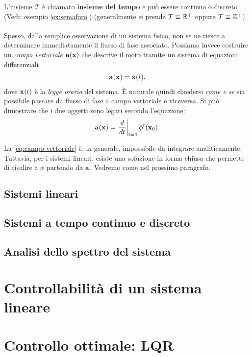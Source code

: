 L'insieme $\mathcal T$ è chiamato \textbf{insieme del tempo} e può essere continuo
o discreto (Vedi: esempio \ref{ex:semaforo}) (generalmente si prende $\mathcal T \equiv \mathbb{R}^+$ oppure $\mathcal T \equiv \mathbb{Z}^+$).

\paragraph{}
Spesso, dalla semplice osservazione di un sistema fisico, non se ne riesce a determinare
immediatamente il flusso di fase associato. Possiamo invece costruire un \emph{campo vettoriale} $\mathbf{a}(\mathbf{x})$
che descrive il moto tramite un sistema di equazioni differenziali
\begin{equation*}
    \mathbf{a}(\mathbf{x}) = \dot {\mathbf{x}} (t),
\end{equation*}
dove $\mathbf{x}(t)$ è la \emph{legge oraria} del sistema.
È naturale quindi chiedersi \emph{come e se} sia possibile passare da flusso di
fase a campo vettoriale e viceversa. Si può dimostrare  che
i due oggetti sono legati secondo l'equazione:
\begin{equation}
    \mathbf{a} (\mathbf{x}) = \left.\frac d {dt} \right| _{t=0} \phi^t (\mathbf{x}_0).
    \label{eq:campo-vettoriale}
\end{equation}

La \eqref{eq:campo-vettoriale} è, in generale, impossibile da integrare analiticamente.
Tuttavia, per i sistemi lineari, esiste una soluzione in forma chiusa che permette di
risalire a $\phi$ partendo da $\mathbf{a}$. Vedremo come nel prossimo paragrafo.



\subsection{Sistemi lineari}



\subsection{Sistemi a tempo continuo e discreto}

\subsection{Analisi dello spettro del sistema}

\section{Controllabilità di un sistema lineare}

\section{Controllo ottimale: LQR} 